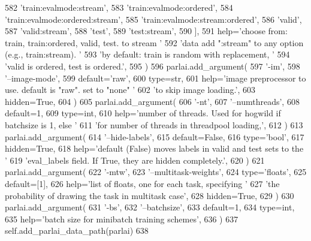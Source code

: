\begin{DoxyCode}
582                 \textcolor{stringliteral}{'train:evalmode:stream'},
583                 \textcolor{stringliteral}{'train:evalmode:ordered'},
584                 \textcolor{stringliteral}{'train:evalmode:ordered:stream'},
585                 \textcolor{stringliteral}{'train:evalmode:stream:ordered'},
586                 \textcolor{stringliteral}{'valid'},
587                 \textcolor{stringliteral}{'valid:stream'},
588                 \textcolor{stringliteral}{'test'},
589                 \textcolor{stringliteral}{'test:stream'},
590             ],
591             help=\textcolor{stringliteral}{'choose from: train, train:ordered, valid, test. to stream '}
592             \textcolor{stringliteral}{'data add ":stream" to any option (e.g., train:stream). '}
593             \textcolor{stringliteral}{'by default: train is random with replacement, '}
594             \textcolor{stringliteral}{'valid is ordered, test is ordered.'},
595         )
596         parlai.add\_argument(
597             \textcolor{stringliteral}{'-im'},
598             \textcolor{stringliteral}{'--image-mode'},
599             default=\textcolor{stringliteral}{'raw'},
600             type=str,
601             help=\textcolor{stringliteral}{'image preprocessor to use. default is "raw". set to "none" '}
602             \textcolor{stringliteral}{'to skip image loading.'},
603             hidden=\textcolor{keyword}{True},
604         )
605         parlai.add\_argument(
606             \textcolor{stringliteral}{'-nt'},
607             \textcolor{stringliteral}{'--numthreads'},
608             default=1,
609             type=int,
610             help=\textcolor{stringliteral}{'number of threads. Used for hogwild if batchsize is 1, else '}
611             \textcolor{stringliteral}{'for number of threads in threadpool loading,'},
612         )
613         parlai.add\_argument(
614             \textcolor{stringliteral}{'--hide-labels'},
615             default=\textcolor{keyword}{False},
616             type=\textcolor{stringliteral}{'bool'},
617             hidden=\textcolor{keyword}{True},
618             help=\textcolor{stringliteral}{'default (False) moves labels in valid and test sets to the '}
619             \textcolor{stringliteral}{'eval\_labels field. If True, they are hidden completely.'},
620         )
621         parlai.add\_argument(
622             \textcolor{stringliteral}{'-mtw'},
623             \textcolor{stringliteral}{'--multitask-weights'},
624             type=\textcolor{stringliteral}{'floats'},
625             default=[1],
626             help=\textcolor{stringliteral}{'list of floats, one for each task, specifying '}
627             \textcolor{stringliteral}{'the probability of drawing the task in multitask case'},
628             hidden=\textcolor{keyword}{True},
629         )
630         parlai.add\_argument(
631             \textcolor{stringliteral}{'-bs'},
632             \textcolor{stringliteral}{'--batchsize'},
633             default=1,
634             type=int,
635             help=\textcolor{stringliteral}{'batch size for minibatch training schemes'},
636         )
637         self.add\_parlai\_data\_path(parlai)
638 
\end{DoxyCode}
